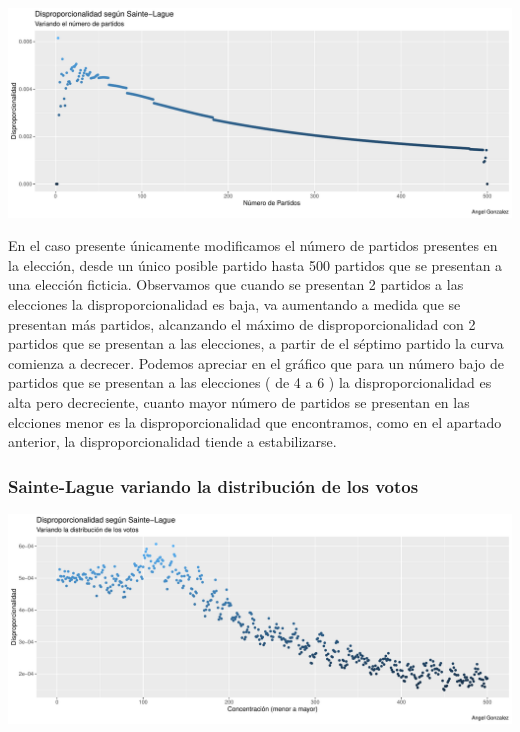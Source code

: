 \documentclass[12pt,a4paper,]{book}
\numberwithin{dummy}{section}
\theoremstyle{ocrenumbox}
\theoremstyle{blacknumex}
\theoremstyle{blacknumbox}
\theoremstyle{ocrenum}
\theoremstyle{ocrenum}
\begin{document}
\begin{center}\includegraphics[width=0.95\linewidth]{figurasR/unnamed-chunk-15-1} \end{center}

En el caso presente únicamente modificamos el número de partidos
presentes en la elección, desde un único posible partido hasta 500
partidos que se presentan a una elección ficticia. Observamos que cuando
se presentan 2 partidos a las elecciones la disproporcionalidad es baja,
va aumentando a medida que se presentan más partidos, alcanzando el
máximo de disproporcionalidad con 2 partidos que se presentan a las
elecciones, a partir de el séptimo partido la curva comienza a decrecer.
Podemos apreciar en el gráfico que para un número bajo de partidos que
se presentan a las elecciones ( de 4 a 6 ) la disproporcionalidad es
alta pero decreciente, cuanto mayor número de partidos se presentan en
las elcciones menor es la disproporcionalidad que encontramos, como en
el apartado anterior, la disproporcionalidad tiende a estabilizarse.

\hypertarget{sainte-lague-variando-la-distribuciuxf3n-de-los-votos}{%
\subsubsection{Sainte-Lague variando la distribución de los
votos}\label{sainte-lague-variando-la-distribuciuxf3n-de-los-votos}}

\begin{center}\includegraphics[width=0.95\linewidth]{figurasR/unnamed-chunk-16-1} \end{center}
\end{document}
